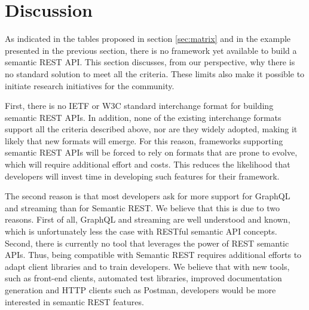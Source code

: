\section{Discussion} \label{sec:discussion}




As indicated in the tables proposed in section \ref{sec:matrix} and in the example presented in the previous section, there is no framework yet available to build a semantic REST API. This section discusses, from our perspective, why there is no standard solution to meet all the criteria. These limits also make it possible to initiate research initiatives for the community. 

First, there is no IETF or W3C standard interchange format for building semantic REST APIs. In addition, none of the existing interchange formats support all the criteria described above, nor are they widely adopted, making it likely that new formats will emerge. For this reason, frameworks supporting semantic REST APIs will be forced to rely on formats that are prone to evolve, which will require additional effort and costs. This reduces the likelihood that developers will invest time in developing such features for their framework.

The second reason is that most developers ask for more support for GraphQL and streaming than for Semantic REST. We believe that this is due to two reasons. First of all, GraphQL and streaming are well understood and known, which is unfortunately less the case with RESTful semantic API concepts. Second, there is currently no tool that leverages the power of REST semantic APIs. Thus, being compatible with Semantic REST requires additional efforts to adapt client libraries and to train developers. We believe that with new tools, such as front-end clients, automated test libraries, improved documentation generation and HTTP clients such as Postman, developers would be more interested in semantic REST features.

